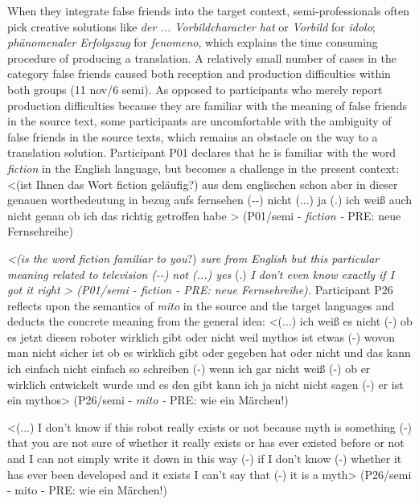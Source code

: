 \documentclass[output=paper]{langsci/langscibook.cls}
\begin{document}
When they integrate false friends into the target context, semi-professionals often pick creative solutions like \textit{der ... Vorbildcharacter hat} or \textit{Vorbild} for \textit{idolo}; \textit{phänomenaler Erfolgszug} for \textit{fenomeno}, which explains the time consuming procedure of producing a translation. A relatively small number of cases in the category false friends caused both reception and production difficulties within both groups (11 nov/6 semi). As opposed to participants who merely report production difficulties because they are familiar with the meaning of false friends in the source text, some participants are uncomfortable with the ambiguity of false friends in the  source texts, which remains an obstacle on the way to a translation solution. Participant P01 declares that he is familiar with the word \textit{fiction} in the English language, but becomes a challenge in the present context: <(ist \textsf{Ihnen das Wort fiction geläufig?) aus dem englischen schon aber in dieser genauen wortbedeutung in bezug aufs fernsehen (-{}-) nicht (...) ja (.) ich weiß auch nicht genau ob ich das richtig getroffen habe > (P01/semi -} \textsf{\textit{fiction -} PRE: neue Fernsehreihe)}

\textsf{\textit{<(}\textit{is the word fiction familiar to you}?) \textit{sure from English but this particular meaning related to television} \textit{(-{}-)} \textit{not (...) yes} (.) \textit{I don't even know exactly if I got it right} \textit{> (P01/semi - fiction - PRE: neue Fernsehreihe).} }Participant P26 reflects upon the semantics of \textit{mito} in the source and the target languages and deducts the concrete meaning from the general idea: \textsf{<(...) ich weiß es nicht (-) ob es jetzt diesen roboter wirklich gibt oder nicht weil mythos ist etwas (-) wovon man nicht sicher ist ob es wirklich gibt oder gegeben hat oder nicht und das kann ich einfach nicht einfach so schreiben (-) wenn ich gar nicht weiß (-) ob er wirklich entwickelt wurde und es den gibt kann ich ja nicht nicht sagen (-) er ist ein mythos> (P26/semi -} \textsf{\textit{mito -} PRE: wie ein Märchen!)} 


<(...) I don't know if this robot really exists or not because myth is something (-) that you are not sure of whether it really exists or has ever existed before or not and I can not simply write it down in this way (-) if I don't know (-) whether it has ever been developed and it exists I can't say that (-) it is a myth> (P26/semi - mito - PRE: wie ein Märchen!)
\end{document}
